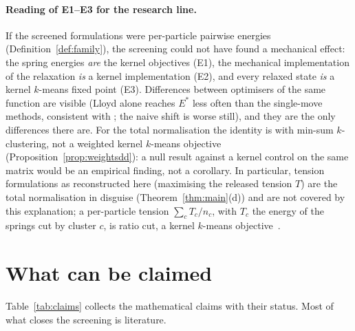 \documentclass[11pt,a4paper]{article}
\theoremstyle{plain}
\theoremstyle{definition}
\theoremstyle{remark}
\begin{document}
\paragraph{Reading of E1--E3 for the research line.} If the screened formulations were per-particle pairwise energies (Definition~\ref{def:family}), the screening could not have found a mechanical effect: the spring energies \emph{are} the kernel objectives (E1), the mechanical implementation of the relaxation \emph{is} a kernel implementation (E2), and every relaxed state \emph{is} a kernel $k$-means fixed point (E3). Differences between optimisers of the same function are visible (Lloyd alone reaches $E^*$ less often than the single-move methods, consistent with \citet{franca2021}; the naive shift is worse still), and they are the only differences there are. For the total normalisation the identity is with min-sum $k$-clustering, not a weighted kernel $k$-means objective (Proposition~\ref{prop:weightsdd}): a null result against a kernel control on the same matrix would be an empirical finding, not a corollary. In particular, tension formulations as reconstructed here (maximising the released tension $T$) are the total normalisation in disguise (Theorem~\ref{thm:main}(d)) and are not covered by this explanation; a per-particle tension $\sum_cT_c/n_c$, with $T_c$ the energy of the springs cut by cluster $c$, is ratio cut, a kernel $k$-means objective~\citep{dhillon2007}.

\section{What can be claimed}\label{sec:claims}

Table~\ref{tab:claims} collects the mathematical claims with their status. Most of what closes the screening is literature.
\end{document}
